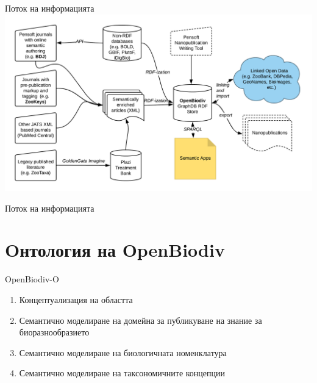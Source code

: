 \documentclass[bulgarian]{beamer}
\begin{document}
\begin{frame}{Поток на информацията}
\centering
\includegraphics[width=\textwidth]{Figures/openbiodiv-sources}
\decoRule

\end{frame}

\begin{frame}{Поток на информацията}
\centering
{}

\end{frame}



\section{Oнтология на OpenBiodiv}

\begin{frame}{OpenBiodiv-O}
\begin{enumerate}
    \item Концептуализация на областта
    \item Семантично моделиране на домейна за публикуване на знание за биоразнообразието
    \item Семантично моделиране на биологичната номенклатура
    \item Семантично моделиране на таксономичните концепции
\end{enumerate}
\end{frame}
\end{document}
